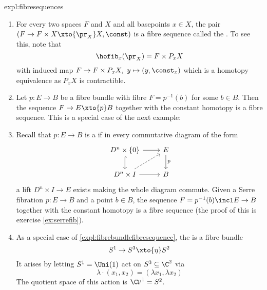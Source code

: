\begin{continueexample}{expl:fibresequences}
	\leavevmode
	\begin{enumerate}[start = 2]
		\item For every two spaces $F$ and $X$ and all basepoints $x \in X$, the pair $(F \to F \times X \xto{\pr_X} X, \const)$ is a fibre sequence called the .
			To see this, note that
			\begin{equation*}
				\hofib_x(\pr_X) = F \times P_x X
			\end{equation*}
			with induced map $F \to F \times P_x X,\ y \mapsto (y, \const_x)$ which is a homotopy equivalence as $P_x X$ is contractible.
		\item\label{expl:fibrebundlefibresequence} Let $p\colon E \to B$ be a fibre bundle with fibre $F = p^{-1}(b)$ for some $b \in B$.
			Then the sequence $F \to E \xto{p} B$ together with the constant homotopy is a fibre sequence.
			This is a special case of the next example:
		\item Recall that $p\colon E \to B$ is a  if in every commutative diagram of the form
			\begin{equation*}
				\begin{tikzcd}
					D^n \times \{0\}
							\ar[r]
							\ar[d, hook]
						& E
							\ar[d, "p"]
					\\
					D^n \times I
							\ar[r]
							\ar[ur, dashed]
						& B
				\end{tikzcd}
			\end{equation*}
			a lift $D^n \times I \to E$ exists making the whole diagram commute.
			Given a Serre fibration $p\colon E \to B$ and a point $b \in B$, the sequence $F = p^{-1}(b) \incl E \to B$ together with the constant homotopy is a fibre sequence (the proof of this is exercise \ref{ex:serrefib}).
		\item\label{expl:hopfbundle} As a special case of \ref{expl:fibrebundlefibresequence}, the  is a fibre bundle
			\begin{equation*}
				S^1 \to S^3 \xto{\eta} S^2
			\end{equation*}
			It arises by letting $S^1 = \Uni(1)$ act on $S^3 \subseteq \C^2$ via
			\begin{equation*}
				\lambda \cdot (x_1, x_2) = (\lambda x_1, \lambda x_2)
			\end{equation*}
			The quotient space of this action is $\CP^1 = S^2$.

\end{enumerate}
\end{continueexample}
